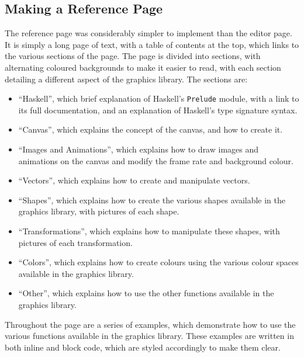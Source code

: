 \documentclass[../main.tex]{subfiles}
\begin{document}
        \subsection{Making a Reference Page}
            The reference page was considerably simpler to implement than the editor page.
            It is simply a long page of text, with a table of contents at the top, which
                links to the various sections of the page.
            The page is divided into sections, with alternating coloured backgrounds to
                make it easier to read, with each section detailing a different aspect of the
                graphics library.
            The sections are:
            \begin{itemize}
                \item ``Haskell'', which brief explanation of Haskell's \texttt{Prelude} module, with a link to its
                      full documentation, and an explanation of Haskell's type signature syntax.
                \item ``Canvas'', which explains the concept of the canvas, and how to create it.
                \item ``Images and Animations'', which explains how to draw images and animations on the canvas and
                      modify the frame rate and background colour.
                \item ``Vectors'', which explains how to create and manipulate vectors.
                \item ``Shapes'', which explains how to create the various shapes available in the graphics library,
                      with pictures of each shape.
                \item ``Transformations'', which explains how to manipulate these shapes, with pictures of each
                      transformation.
                \item ``Colors'', which explains how to create colours using the various colour spaces available in
                      the graphics library.
                \item ``Other'', which explains how to use the other functions available in the graphics library.
            \end{itemize}

            Throughout the page are a series of examples, which demonstrate how to use the
                various functions available in the graphics library.
            These examples are written in both inline and block code, which are styled
                accordingly to make them clear.
\end{document}
